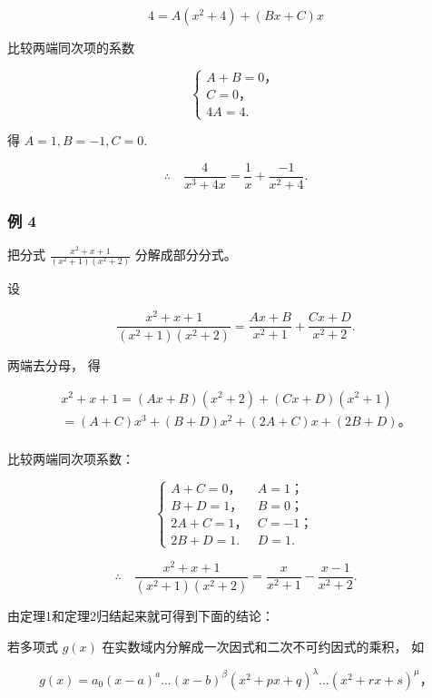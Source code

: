 \[
4 = A (x ^ {2} + 4) + (B x + C) x
\]

比较两端同次项的系数

\[
\left\{ \begin{array}{l} A + B = 0\text{，} \\ C = 0\text{，} \\ 4 A = 4. \end{array} \right.
\]

得 \(A = 1, B = -1, C = 0.\)

\[
\therefore \quad \frac {4}{x ^ {3} + 4 x} = \frac {1}{x} + \frac {- 1}{x ^ {2} + 4}.
\]

\subsubsection{例 4}

把分式 \(\frac{x^2 + x + 1}{(x^2 + 1)(x^2 + 2)}\) 分解成部分分式。

 设

\[
\frac {x ^ {2} + x + 1}{(x ^ {2} + 1) (x ^ {2} + 2)} = \frac {A x + B}{x ^ {2} + 1} + \frac {C x + D}{x ^ {2} + 2}.
\]

两端去分母， 得

\[
\begin{array}{l} x ^ {2} + x + 1 = (A x + B) (x ^ {2} + 2) + (C x + D) (x ^ {2} + 1) \\ = (A + C) x ^ {3} + (B + D) x ^ {2} + (2 A + C) x + (2 B + D)\text{。} \\ \end{array}
\]

比较两端同次项系数：

\[
\left\{ \begin{array}{ll} A + C = 0\text{，} & A = 1\text{；} \\ B + D = 1\text{，} & B = 0\text{；} \\ 2 A + C = 1\text{，} & C = - 1\text{；} \\ 2 B + D = 1. & D = 1. \end{array} \right.
\]

\[
\therefore \quad \frac {x ^ {2} + x + 1}{(x ^ {2} + 1) (x ^ {2} + 2)} = \frac {x}{x ^ {2} + 1} - \frac {x - 1}{x ^ {2} + 2}.
\]

由定理1和定理2归结起来就可得到下面的结论：

若多项式 \(g(x)\) 在实数域内分解成一次因式和二次不可约因式的乘积， 如

\[
g (x) = a _ {0} (x - a) ^ {a} \dots (x - b) ^ {\beta} (x ^ {2} + p x + q) ^ {\lambda} \dots (x ^ {2} + r x + s) ^ {\mu}\text{，}
\]

